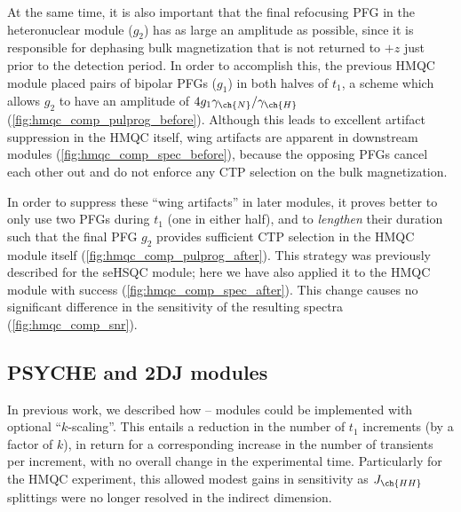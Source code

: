 \documentclass[a4paper,11pt]{article}
\newcommand{\proton}{\ch{^{1}H}}
\newcommand{\nitrogen}{\ch{^{15}N}}
\newcommand{\HN}{\proton{}--\nitrogen{}}
\begin{document}
\begin{refsection}
At the same time, it is also important that the final refocusing PFG in the heteronuclear module (\(g_2\)) has as large an amplitude as possible, since it is responsible for dephasing bulk magnetization that is not returned to \(+z\) just prior to the detection period.
In order to accomplish this, the previous \nitrogen{} HMQC module placed pairs of bipolar PFGs (\(g_1\)) in both halves of \(t_1\), a scheme which allows \(g_2\) to have an amplitude of \(4g_1\gamma_{\ch{N}}/\gamma_{\ch{H}}\) (\cref{fig:hmqc_comp_pulprog_before}).
Although this leads to excellent artifact suppression in the \nitrogen{} HMQC itself, wing artifacts are apparent in downstream modules (\cref{fig:hmqc_comp_spec_before}), because the opposing PFGs cancel each other out and do not enforce any CTP selection on the bulk magnetization.

In order to suppress these ``wing artifacts'' in later modules, it proves better to only use two PFGs during \(t_1\) (one in either half), and to \textit{lengthen} their duration such that the final PFG \(g_2\) provides sufficient CTP selection in the HMQC module itself (\cref{fig:hmqc_comp_pulprog_after}).
This strategy was previously described for the \nitrogen{} seHSQC module;\autocite{Yong2021JMR} here we have also applied it to the HMQC module with success (\cref{fig:hmqc_comp_spec_after}).
This change causes no significant difference in the sensitivity of the resulting spectra (\cref{fig:hmqc_comp_snr}).

\subsection{PSYCHE and 2DJ modules}

In previous work,\autocite{Yong2021JMR} we described how \HN{} modules could be implemented with optional ``\(k\)-scaling''.\autocite{PerezTrujillo2007MRC}
This entails a reduction in the number of \(t_1\) increments (by a factor of \(k\)), in return for a corresponding increase in the number of transients per increment, with no overall change in the experimental time.
Particularly for the HMQC experiment, this allowed modest gains in sensitivity as \(J_{\ch{HH}}\) splittings were no longer resolved in the indirect dimension.


\end{refsection}
\end{document}
